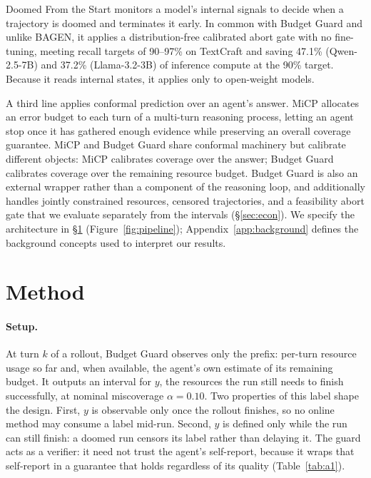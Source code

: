 \documentclass{article}
\newcommand{\bg}{Budget Guard}
\begin{document}
Doomed From the Start \cite{ruan2026doomed} monitors a model's internal signals to
decide when a trajectory is doomed and terminates it early. In common with \bg{} and
unlike BAGEN, it applies a distribution-free calibrated abort gate with no fine-tuning,
meeting recall targets of 90--97\% on TextCraft and saving 47.1\% (Qwen-2.5-7B) and
37.2\% (Llama-3.2-3B) of inference compute at the 90\% target. Because it reads
internal states, it applies only to open-weight models.

A third line applies conformal prediction over an agent's answer. MiCP
\cite{zhou2026micp} allocates an error budget to each turn of a multi-turn reasoning
process, letting an agent stop once it has gathered enough evidence while preserving an
overall coverage guarantee. MiCP and \bg{} share conformal machinery but calibrate
different objects: MiCP calibrates coverage over the answer; \bg{} calibrates coverage
over the remaining resource budget. \bg{} is also an external wrapper rather than a
component of the reasoning loop, and additionally handles jointly constrained
resources, censored trajectories, and a feasibility abort gate that we evaluate
separately from the intervals (\S\ref{sec:econ}). We specify the architecture in
\S\ref{sec:method} (Figure~\ref{fig:pipeline}); Appendix~\ref{app:background} defines
the background concepts used to interpret our results.

\section{Method}
\label{sec:method}

\paragraph{Setup.} At turn $k$ of a rollout, \bg{} observes only the prefix: per-turn
resource usage so far and, when available, the agent's own estimate of its remaining
budget. It outputs an interval for $y$, the resources the run still needs to finish
successfully, at nominal miscoverage $\alpha{=}0.10$. Two properties of this label
shape the design. First, $y$ is observable only once the rollout finishes, so no online
method may consume a label mid-run. Second, $y$ is defined only while the run can still
finish: a doomed run censors its label rather than delaying it. The guard acts as a
verifier: it need not trust the agent's self-report, because it wraps that self-report
in a guarantee that holds regardless of its quality (Table~\ref{tab:a1}).
\end{document}
